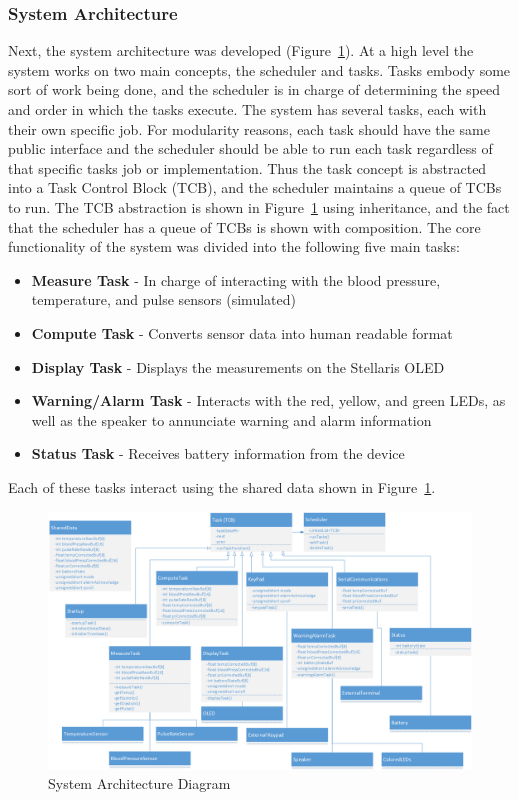 \documentclass[12pt]{article} %
\begin{document}
\subsubsection{System Architecture}
Next, the system architecture was developed (Figure~\ref{fig:arch}).  At a high
level the system works on two main concepts, the scheduler and tasks.  Tasks
embody some sort of work being done, and the scheduler is in charge of
determining the speed and order in which the tasks execute.  The system has
several tasks, each with their own specific job.  For modularity reasons, each
task should have the same public interface and the scheduler should be able to
run each task regardless of that specific tasks job or implementation.  Thus
the task concept is abstracted into a Task Control Block (TCB), and the
scheduler maintains a queue of TCBs to run.  The TCB abstraction is shown in
Figure~\ref{fig:arch} using inheritance, and the fact that the scheduler has a
queue of TCBs is shown with composition.  The core functionality of the system
was divided into the following five main tasks:
\begin{itemize}
  \item \textbf{Measure Task} - In charge of interacting with the blood pressure, temperature, and pulse sensors (simulated)
  \item \textbf{Compute Task} - Converts sensor data into human readable format
  \item \textbf{Display Task} - Displays the measurements on the Stellaris OLED
  \item \textbf{Warning/Alarm Task} - Interacts with the red, yellow, and green LEDs, as well as the speaker to annunciate warning and alarm information
  \item \textbf{Status Task} - Receives battery information from the device
\end{itemize}
Each of these tasks interact using the shared data shown in Figure~\ref{fig:arch}. 

\begin{figure}
    \centering
    \includegraphics[width=\textwidth]{../design/System_Architecture}
    \caption{System Architecture Diagram}
    \label{fig:arch}
\end{figure}
\end{document}
